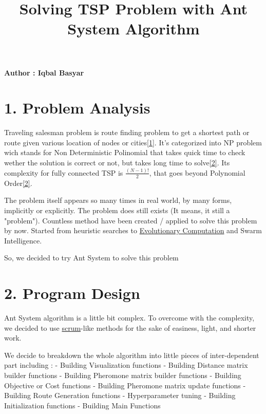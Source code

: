 \documentclass[11pt]{article}
\title{Solving TSP Problem with Ant System Algorithm}
\begin{document}
    
    
    \maketitle
    
    

    
    \paragraph{Author : Iqbal Basyar}\label{author-iqbal-basyar}

\section{1. Problem Analysis}\label{problem-analysis}

Traveling salesman problem is route finding problem to get a shortest
path or route given various location of nodes or
cities\href{https://en.wikipedia.org/wiki/Travelling_salesman_problem}{{[}1{]}}.
It's categorized into NP problem wich stands for Non Deterministic
Polinomial that takes quick time to check wether the solution is correct
or not, but takes long time to
solve\href{https://en.wikipedia.org/wiki/P_versus_NP_problem}{{[}2{]}}.
Its complexity for fully connected TSP is \(\frac{(N-1)!}{2}\), that
goes beyond Polynomial
Order\href{https://en.wikipedia.org/wiki/P_versus_NP_problem}{{[}2{]}}.

The problem itself appears so many times in real world, by many forms,
implicitly or explicitly. The problem does still exists (It means, it
still a "problem"). Countless method have been created / applied to
solve this problem by now. Started from heuristic searches to
\href{https://en.wikipedia.org/wiki/Evolutionary_computation}{Evolutionary
Computation} and Swarm Intelligence.

So, we decided to try Ant System to solve this problem

\section{2. Program Design}\label{program-design}

Ant System algorithm is a little bit complex. To overcome with the
complexity, we decided to use
\href{http://www.mountaingoatsoftware.com/agile/scrum}{scrum}-like
methods for the sake of easiness, light, and shorter work.

We decide to breakdown the whole algorithm into little pieces of
inter-dependent part including : - Building Visualization functions -
Building Distance matrix builder functions - Building Pheromone matrix
builder functions - Building Objective or Cost functions - Building
Pheromone matrix update functions - Building Route Generation functions
- Hyperparameter tuning - Building Initialization functions - Building
Main Functions
\end{document}
